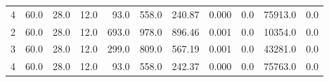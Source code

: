 \begin{tabular}{lrrrrrrrrrr}
4 &                60.0 &                28.0 &                 12.0 &          93.0 &         558.0 &        240.87 &                                         0.000 &                      0.0 &                     75913.0 &                           0.0 \\
2 &                60.0 &                28.0 &                 12.0 &         693.0 &         978.0 &        896.46 &                                         0.001 &                      0.0 &                     10354.0 &                           0.0 \\
3 &                60.0 &                28.0 &                 12.0 &         299.0 &         809.0 &        567.19 &                                         0.001 &                      0.0 &                     43281.0 &                           0.0 \\
4 &                60.0 &                28.0 &                 12.0 &          93.0 &         558.0 &        242.37 &                                         0.000 &                      0.0 &                     75763.0 &                           0.0 \\
\bottomrule
\end{tabular}
